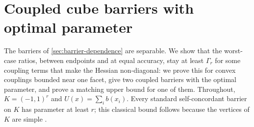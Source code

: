 \section{Coupled cube barriers with optimal parameter}
\label{sec:coupled-barriers}
The barriers of \cref{sec:barrier-dependence} are separable. We show
that the worst-case ratios, between endpoints and at equal accuracy,
stay at least $\Gamma_r$ for some coupling terms that make the Hessian
non-diagonal: we prove this for convex couplings bounded near one
facet, give two coupled barriers with the optimal parameter, and prove a
matching upper bound for one of them. Throughout, $K=(-1,1)^r$ and
$U(x)=\sum_i b(x_i)$. Every standard self-concordant barrier on $K$ has
parameter at least $r$; this classical bound follows because the
vertices of $K$ are simple \cite[Proposition 2.3.6]{NesterovNemirovskii1994}.

